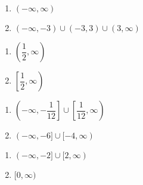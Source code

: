 \begin{multicols}{2}

\begin{enumerate}

\setcounter{enumi}{\value{HW}}

\item $(-\infty, \infty)$
\item  $(-\infty, -3) \cup (-3,3) \cup (3, \infty)$

\setcounter{HW}{\value{enumi}}

\end{enumerate}

\end{multicols}

\begin{multicols}{2}

\begin{enumerate}

\setcounter{enumi}{\value{HW}}

\item  $\left(\dfrac{1}{2}, \infty \right)$
\item  $\left[\dfrac{1}{2}, \infty \right)$

\setcounter{HW}{\value{enumi}}

\end{enumerate}

\end{multicols}

\begin{multicols}{2}

\begin{enumerate}

\setcounter{enumi}{\value{HW}}

\item  $\left(-\infty, -\dfrac{1}{12}\right] \cup \left[\dfrac{1}{12}, \infty\right)$
\item  $(-\infty, -6] \cup [-4, \infty)$ 

\setcounter{HW}{\value{enumi}}

\end{enumerate}

\end{multicols}

\begin{multicols}{2}

\begin{enumerate}

\setcounter{enumi}{\value{HW}}

\item $(-\infty, -2] \cup [2, \infty)$
\item  $[0, \infty)$

\end{enumerate}

\end{multicols}

\closegraphsfile